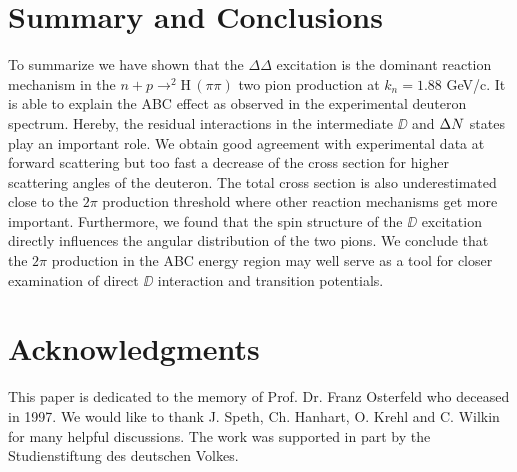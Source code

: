 \section{Summary and Conclusions}
\label{sec:3}

To summarize we have shown that the $\Delta \Delta$ excitation is the 
dominant reaction mechanism in the $n+p \to ^2$H$\, (\pi\pi)$ two pion 
production at $k_n = 1.88$ GeV/c. It is able to explain the ABC effect
as observed in the experimental deuteron spectrum. Hereby, the residual 
interactions in the intermediate $\DD$ and ${\Delta N}$ states play an important role.
We obtain good agreement with experimental data at forward scattering
but too fast a decrease of the cross section for higher scattering
angles of the deuteron. The total cross section is also underestimated
close to the $2 \pi$ production threshold where other reaction
mechanisms get more important.
Furthermore, we found that the spin structure of the $\DD$ 
excitation directly influences the angular distribution of the two pions.
We conclude that the $2 \pi$ production in the ABC energy region 
may well serve as a tool for closer examination of direct $\DD$ 
interaction and transition potentials.



\section*{Acknowledgments}

This paper is dedicated to the memory of Prof. Dr. Franz Osterfeld
who deceased in 1997. 
We would like to thank J. Speth, Ch. Hanhart, O. Krehl and C. Wilkin 
for many helpful discussions. The work was supported in part by the 
Studienstiftung des deutschen Volkes.




